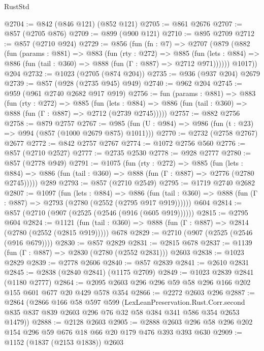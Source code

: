 \begin{lexlean}{RustStd}
\begin{coremodule}
@2704 := @842 (@846 @121) (@852 @121)
@2705 := @861 @2676
@2707 := @857 (@2705 @876)
@2709 := @899 (@900 @121)
@2710 := @895 @2709
@2712 := @857 (@2710 @924)
@2729 := @856
    (fun (fn : @7) =>
    @2707
      (@879
        (@882
          (fun (params : @881) =>
          @883
            (fun (rty : @272) =>
            @885
              (fun (lets : @884) =>
              @886 (fun (tail : @360) => @888 (fun (Γ : @887) => @2712 @971))))))
        @1017))
    @204
@2732 := @1023 (@2705 (@874 @204))
@2735 := @936 (@937 @204) @2679
@2739 := @857 (@928 (@2735 @945) @949)
@2740 := @962 @204
@2745 := @959 (@961 @2740 @2682 @917 @919)
@2756 := fun (params : @881) =>
  @883
    (fun (rty : @272) =>
    @885
      (fun (lets : @884) =>
      @886 (fun (tail : @360) => @888 (fun (Γ : @887) => @2712 (@2739 @2745)))))
@2757 := @882 @2756
@2758 := @879 @2757
@2767 := @985 (fun (U : @984) => @986 (fun (t : @23) => @994 (@857 (@1000 @2679 @875) @1011)))
@2770 := @2732 (@2758 @2767) @2677
@2772 := @842 @2757 @2767
@2774 := @1072 @2756 @560
@2776 := @857 (@2710 @2527)
@2777 := @2735 @2530
@2778 := @928 @2777
@2780 := @857 (@2778 @949)
@2791 := @1075
    (fun (rty : @272) =>
    @885
      (fun (lets : @884) =>
      @886 (fun (tail : @360) => @888 (fun (Γ : @887) => @2776 (@2780 @2745)))))
    @289
@2793 := @857 (@2710 @2549)
@2795 := @1719 @2740 @2682
@2807 := @1097
    (fun (lets : @884) =>
    @886 (fun (tail : @360) => @888 (fun (Γ : @887) => @2793 (@2780 (@2552 (@2795 @917 @919))))))
    @604
@2814 := @857 (@2710 (@907 (@2525 (@2546 (@916 (@605 @919))))))
@2815 := @2795 @604
@2824 := @1121
    (fun (tail : @360) => @888 (fun (Γ : @887) => @2814 (@2780 (@2552 (@2815 @919)))))
    @678
@2829 := @2710 (@907 (@2525 (@2546 (@916 @679))))
@2830 := @857 @2829
@2831 := @2815 @678
@2837 := @1139 (fun (Γ : @887) => @2830 (@2780 (@2552 @2831))) @2603
@2838 := @1023 @2829
@2839 := @2778 @2606
@2840 := @857 @2839
@2841 := @2610 @2831
@2845 := @2838 (@2840 @2841) (@1175 @2709)
@2849 := @1023 @2839 @2841 (@1180 @2777)
@2864 := @2095 @2603 @296 @296 @59 @58 @296 @166 @202 @155 @601 @677 @20 @429 @578 @354
@2866 := @2272 @2603 @296
@2887 := @2864
    (@2866
      @166
      @58
      @597
      @599
      (LexLeanPreservation.Rust.Corr.second
        @835
        @837
        @839
        @2603
        @296
        @76
        @32
        @58
        @384
        @341
        @586
        @354
        @2653
        @1479))
@2888 := @2128 @2603
@2905 := @2888 @2603 @296 @58 @296 @202 @154 @296 @59 @676 @18 @66 @20 @179 @476 @393 @393 @630
@2909 := @1152 (@1837 (@2153 @1838)) @2603

\end{coremodule}
\end{lexlean}
